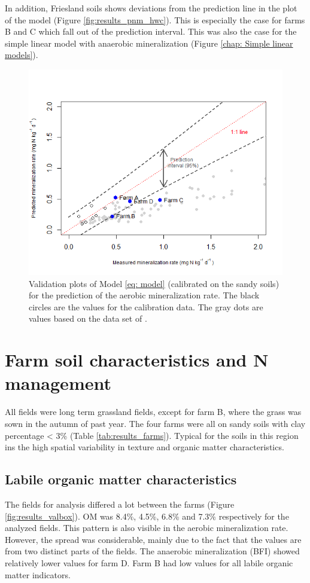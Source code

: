 \documentclass[10pt,twoside,dutch,english]{report}
\begin{document}
In addition, Friesland soils  shows deviations from the prediction line in the plot of the model (Figure \ref{fig:results_pnm_hwc}). This is especially the case for  farms B and C which fall out of the prediction interval. This was also the case for the simple linear model with anaerobic mineralization (Figure \ref{chap: Simple linear models}). 



\begin{figure}[H]
\centering
   \includegraphics[width=0.8\linewidth]{results_val_pm}
	\caption{Validation plots of Model \ref{eq: model} (calibrated on the sandy soils) for the prediction of the aerobic mineralization rate. The black circles are the values for the calibration data. The gray dots are values based on the data set of \citet{Ros2011}.} 
    \label{fig:val_pm}
	\end{figure}
    
 
\section{Farm soil characteristics and N management}
All fields were long term grassland fields, except for farm B, where the grass was sown in the autumn of past year. The four farms were all on sandy soils with clay percentage < 3\% (Table \ref{tab:results_farms}). Typical for the soils in this region ins the high spatial variability in texture and organic matter characteristics. 
	
\subsection{Labile organic matter characteristics}
 The fields for analysis differed a lot between the farms (Figure \ref{fig:results_valbox}).  OM was 8.4\%, 4.5\%, 6.8\% and 7.3\% respectively for the analyzed fields. This pattern is also visible in the aerobic mineralization rate. However, the spread was considerable, mainly due to the fact that the values are from two distinct parts of the fields. The anaerobic mineralization (BFI) showed relatively lower values for farm D. Farm B had low values for all labile organic matter indicators. 
\end{document}
